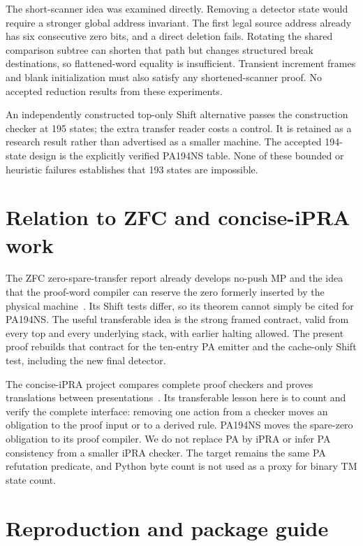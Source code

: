 \documentclass[11pt,letterpaper]{article}
\begin{document}
The short-scanner idea was examined directly. Removing a detector state
would require a stronger global address invariant. The first legal source
address already has six consecutive zero bits, and a direct deletion
fails. Rotating the shared comparison subtree can shorten that path but
changes structured break destinations, so flattened-word equality is
insufficient. Transient increment frames and blank initialization must
also satisfy any shortened-scanner proof. No accepted reduction results
from these experiments.

An independently constructed top-only Shift alternative passes the
construction checker at 195 states; the extra transfer reader costs a
control. It is retained as a research result rather than advertised as a
smaller machine. The accepted 194-state design is the explicitly verified
PA194NS table. None of these bounded or heuristic failures establishes
that 193 states are impossible.

\section{Relation to ZFC and concise-iPRA work}

The ZFC zero-spare-transfer report already develops no-push MP and the
idea that the proof-word compiler can reserve the zero formerly inserted
by the physical machine~\cite{zfc}. Its Shift tests differ, so its theorem
cannot simply be cited for PA194NS. The useful transferable idea is the
strong framed contract, valid from every top and every underlying stack,
with earlier halting allowed. The present proof rebuilds that contract for
the ten-entry PA emitter and the cache-only Shift test, including the new
final detector.

The concise-iPRA project compares complete proof checkers and proves
translations between presentations~\cite{ipra}. Its transferable lesson
here is to count and verify the complete interface: removing one action
from a checker moves an obligation to the proof input or to a derived
rule. PA194NS moves the spare-zero obligation to its proof compiler.
We do not replace PA by iPRA or infer PA consistency from a smaller iPRA
checker. The target remains the same PA refutation predicate, and Python
byte count is not used as a proxy for binary TM state count.

\section{Reproduction and package guide}
\end{document}
